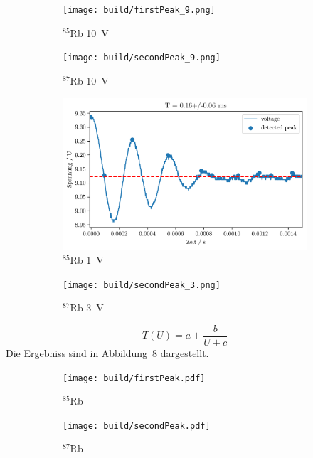 \begin{figure}[h]
	\centering
	\begin{subfigure}[c]{0.45\textwidth}
	\begin{center}
		\texttt{[image: build/firstPeak\_9.png]}
	\end{center}
	\caption{$^{85}$Rb \SI{10}{\volt}}
	\label{fig:}
	\end{subfigure}
	\begin{subfigure}[c]{0.45\textwidth}
	\begin{center}
		\texttt{[image: build/secondPeak\_9.png]}
	\end{center}
	\caption{$^{87}$Rb \SI{10}{\volt}}
	\label{fig:}
	\end{subfigure}

	\begin{subfigure}[c]{0.45\textwidth}
	\begin{center}
		\includegraphics[width=\textwidth]{picture/firstPeak_3.png}
	\end{center}
	\caption{$^{85}$Rb \SI{1}{\volt}}
	\label{fig:85a}
	\end{subfigure}
	\begin{subfigure}[c]{0.45\textwidth}
	\begin{center}
		\texttt{[image: build/secondPeak\_3.png]}
	\end{center}
	\caption{$^{87}$Rb \SI{3}{\volt}}
	\label{fig:}
	\end{subfigure}
	\caption{}
	\label{fig:periode}
\end{figure}
\begin{equation}
	\label{eq:fit}
	T(U) = a + \frac{b}{U + c}
\end{equation}
Die Ergebniss sind in Abbildung~\ref{fig:fitexp} dargestellt.
\begin{figure}[h]
	\centering
	\begin{subfigure}[c]{0.45\textwidth}
	\begin{center}
		\texttt{[image: build/firstPeak.pdf]}
	\end{center}
	\caption{$^{85}$Rb}
	\label{fig:}
	\end{subfigure}
	\begin{subfigure}[c]{0.45\textwidth}
	\begin{center}
	\texttt{[image: build/secondPeak.pdf]}
	\end{center}
	\caption{$^{87}$Rb}
	\label{fig:}
	\end{subfigure}
	\caption{}
	\label{fig:fitexp}
\end{figure}
